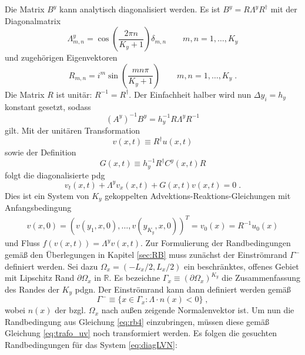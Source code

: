 Die Matrix $B^y$ kann analytisch diagonalisiert werden. Es ist ${B^y = R\Lambda^y R^{\dagger}}$ mit der Diagonalmatrix
\begin{equation}
  \Lambda^y_{m,n} = \cos\left(\frac{2\pi n}{K_y+1}\right)\delta_{m,n}   \qquad m,n = 1,\dots,K_y
  \label{eq:Lambda}
\end{equation}
und zugehörigen Eigenvektoren
\begin{equation}
  R_{m,n} = i^m \sin\left(\frac{mn\pi}{K_y +1} \right)   \qquad m,n = 1,\dots,K_y \; .
\end{equation}
Die Matrix $R$ ist unitär: $R^{-1} = R^{\dagger}$. Der Einfachheit halber wird nun $\Delta y_i = h_y$ konstant gesetzt, sodass
\begin{equation}
  (A^y)^{-1}B^y = h_y^{-1}R\Lambda^y R^{-1}
\end{equation}
gilt. Mit der unitären Transformation
\begin{equation}
  v(x,t) \equiv R^{\dagger}u(x,t) \label{eq:trafo_uv}
\end{equation}
sowie der Definition
\begin{equation}
  G(x,t) \equiv h_y^{-1} R^{\dagger}C^y(x,t)R
  \label{eq:G}
\end{equation}
folgt die diagonalisierte \ac{pdg}
\begin{equation}
  v_t(x,t) + \Lambda^y v_x(x,t) + G(x,t)v(x,t) = 0 \; .
  \label{eq:diagLVN}
\end{equation}
Dies ist ein System von $K_y$ gekoppelten Advektions-Reaktions-Gleichungen mit Anfangsbedingung
\begin{align}
  v(x,0) = (v(y_1,x,0),\dots,v(y_{K_y},x,0))^T = {v}_0(x) = R^{-1}u_0(x)
\end{align}
und Fluss ${{f}({v}(x,t))=\Lambda^y {v}(x,t)}$. Zur Formulierung der Randbedingungen gemäß den Überlegungen in Kapitel \ref{sec:RB} muss zunächst der Einströmrand $\Gamma^-$ definiert werden.
Sei dazu ${\Omega_x = (-L_x/2,L_x/2)}$ ein beschränktes, offenes Gebiet mit Lipschitz Rand $\partial\Omega_x$ in  $\mathbb{R}$. Es bezeichne $\Gamma_x\equiv (\partial\Omega_x)^{K_y}$ die Zusammenfassung des Randes der $K_y$ \ac{pdg}n. Der Einströmrand kann dann definiert werden gemäß
\begin{equation}
  \Gamma^- \equiv \{x\in\Gamma_x : \Lambda \cdot n(x) < 0\} \; ,
\end{equation}
wobei $n(x)$ der bzgl. $\Omega_x$ nach außen zeigende Normalenvektor ist. Um nun die Randbedingung aus Gleichung \eqref{eq:rb4} einzubringen, müssen diese gemäß Gleichung \eqref{eq:trafo_uv} noch transformiert werden. Es folgen die gesuchten Randbedingungen für das System \eqref{eq:diagLVN}:

